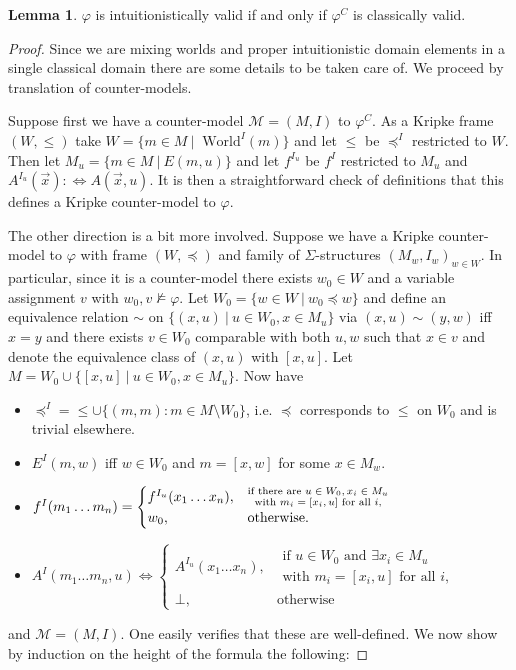 \documentclass{easychair}
\theoremstyle{definition}
\theoremstyle{definition}
\theoremstyle{definition}
\newtheorem{lemma}[theorem]{Lemma}
\theoremstyle{definition}
\theoremstyle{definition}
\theoremstyle{definition}
\theoremstyle{definition}
\begin{document}
\begin{lemma}\label{proof:fo-simplification}
	$\varphi$ is intuitionistically valid if and only if $\varphi^C$ is classically valid.
\end{lemma}

\begin{proof}
	Since we are mixing worlds and proper intuitionistic domain elements in a single classical domain there are some details to be taken care of. We proceed by translation of counter-models.
	
	Suppose first we have a counter-model $\mathcal M = (M, I)$ to $\varphi^C$. As a Kripke frame $(W, \leq)$ take $ W = \{m\in M\:|\:\text{ World}^I(m)\}$ and let $\leq$ be $\preceq^I$ restricted to $W$. Then let $M_u = \{m\in M\:|\: E(m, u)\}$ and let $f^{I_u}$ be $f^I$ restricted to $M_u$ and $A^{I_u}(\vec x): \Leftrightarrow A(\vec x, u)$. It is then a straightforward check of definitions that this defines a Kripke counter-model to $\varphi$.
	
	The other direction is a bit more involved. Suppose we have a Kripke counter-model to $\varphi$ with frame $(W, \preceq)$ and family of $\Sigma$-structures $(M_w, I_w)_{w\in W}$.
In particular, since it is a counter-model there exists $w_0\in W$ and a variable assignment $v$ with $w_0, v\not\models\varphi$.
Let $W_0 = \{w\in W\:|\: w_0\preceq w\}$ and define an equivalence relation $\sim$ on $\{(x, u)\:|\:u\in W_0, x\in M_u\}$ via $(x, u)\sim (y, w)$ iff $x = y$ and there exists $v\in W_0$ comparable with both $u, w$ such that $x\in v$ and denote the equivalence class of $(x, u)$ with $[x, u]$. Let $M = W_0\cup \{[x, u]\:|\:u\in W_0, x\in M_u\}$.
	Now have
	\begin{itemize}
		\item $\preceq^I = \leq\cup \{(m, m): m\in M\setminus W_0\}$, i.e. $\preceq$ corresponds to $\leq$ on $W_0$ and is trivial elsewhere.
		\item $E^I(m, w)$ iff $w\in W_0$ and $m = [x, w]$ for some $x\in M_w$.
		\item $f^I(m_1\dots m_n) =\begin{cases}
			f^{I_u}(x_1\dots x_n), &\substack{\text{if there are $ u\in W_0, x_i\in M_u$}\\ \text{with $m_i= [x_i, u]$ for all $i$,}}\\
			w_0, & \text{otherwise.}
		\end{cases}$
		\item ${A}^I(m_1\dots m_n, u) \Leftrightarrow\begin{cases}
			A^{I_u}(x_1\dots x_n), &\substack{\text{if $u\in W_0$ and $\exists x_i\in M_u$}\\\text{with $m_i= [x_i, u]$ for all $i$,}}\\
			\bot, & \text{otherwise}
		\end{cases}$
	\end{itemize}
	and $\mathcal M = (M, I)$. One easily verifies that these are well-defined. We now show by induction on the height of the formula the following:
	

\end{proof}
\end{document}
